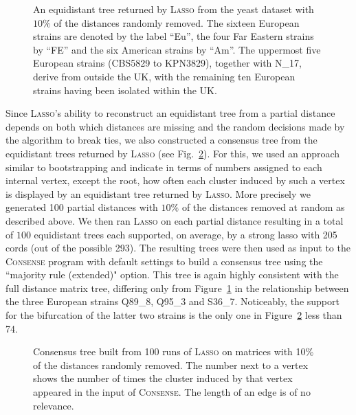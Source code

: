 \begin{figure}
  \centering
  \begin{tikzpicture}[xscale=50,yscale=0.35]
    
  \end{tikzpicture}
  \endpgfgraphicnamed
  \caption{An equidistant tree returned by \textsc{Lasso} from the yeast
    dataset with $10\%$ of the distances randomly removed. The sixteen
    European strains are denoted by the label ``Eu'', the four Far Eastern
    strains by ``FE'' and the six American strains by ``Am''. The uppermost
    five European strains (CBS5829 to KPN3829), together with N\_17, derive
    from outside the UK, with the remaining ten European strains having been
    isolated within the UK.}
  \label{fig:yeast-tree-complete}
\end{figure}

Since \textsc{Lasso}'s ability to reconstruct an equidistant tree from a
partial distance depends on both which distances are missing and the random
decisions made by the algorithm to break ties, we also constructed a consensus
tree from the equidistant trees returned by \textsc{Lasso} (see
Fig.~\ref{fig:yeast-tree-consense}).  For this, we used an approach similar to
bootstrapping and indicate in terms of numbers assigned to each internal
vertex, except the root, how often each cluster induced by such a vertex is
displayed by an equidistant tree returned by \textsc{Lasso}.  More precisely
we generated 100 partial distances with $10\%$ of the distances removed at
random as described above.  We then ran \textsc{Lasso} on each partial
distance resulting in a total of $100$ equidistant trees each supported, on
average, by a strong lasso with 205 cords (out of the possible 293).  The
resulting trees were then used as input to the \textsc{Consense} program
\cite{felsenstein1993phylip} with default settings to build a consensus tree
using the ``majority rule (extended)" option. This tree is again highly
consistent with the full distance matrix tree, differing only from
Figure~\ref{fig:yeast-tree-complete} in the relationship between the three
European strains Q89\_8, Q95\_3 and S36\_7. Noticeably, the support for the
bifurcation of the latter two strains is the only one in
Figure~\ref{fig:yeast-tree-consense} less than 74.

\begin{figure}
  \centering
  \begin{tikzpicture}[xscale=0.8,yscale=0.35]
    
  \end{tikzpicture}
  \endpgfgraphicnamed
  \caption{Consensus tree built from 100 runs of \textsc{Lasso} on matrices
    with 10\% of the distances randomly removed.  The number next to a vertex
    shows the number of times the cluster induced by that vertex appeared in
    the input of \textsc{Consense}. The length of an edge is of no relevance.}
  \label{fig:yeast-tree-consense}
\end{figure}

